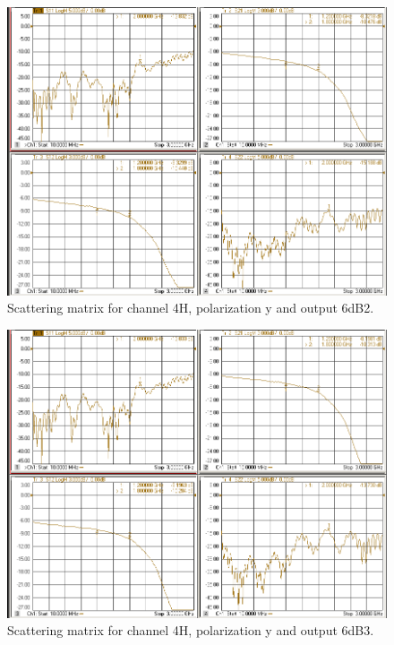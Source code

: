 \documentclass[12pt,a4paper,oneside]{article}
\begin{document}
\begin{figure}[H]
\centering
\includegraphics[width=0.9\linewidth]{VNA_results/4Hy_6dB2.png}
\caption{Scattering matrix for channel 4H, polarization y and output 6dB2.}
\label{fig:4Hy_6dB2}
\end{figure}


\begin{figure}[H]
\centering
\includegraphics[width=0.9\linewidth]{VNA_results/4Hy_6dB3.png}
\caption{Scattering matrix for channel 4H, polarization y and output 6dB3.}
\label{fig:4Hy_6dB3}
\end{figure}
\end{document}
